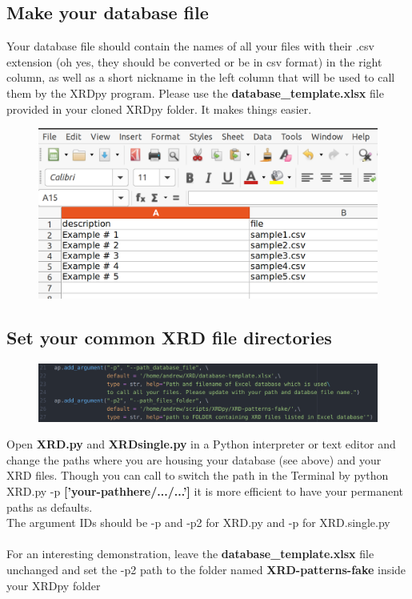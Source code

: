 \documentclass{article}
\begin{document}
\subsection{Make your database file}

Your database file should contain the names of all your files with their .csv extension (oh yes, they should be converted or be in csv format) in the right column, as well as a short nickname in the left column that will be used to call them by the XRDpy program. Please use the \textbf{database\_template.xlsx} file provided in your cloned XRDpy folder. It makes things easier.

\begin{figure}[htbp]
\centerline{\includegraphics[scale=.2]{database-template.png}}
\label{fig4}
\end{figure}

\subsection{Set your common XRD file directories}

\begin{figure}[htbp]
\centerline{\includegraphics[scale=.27]{xrd-paths.png}}
\label{fig5}
\end{figure}

Open \textbf{XRD.py} and \textbf{XRDsingle.py} in a Python interpreter or text editor and change the paths where you are housing your database (see above) and your XRD files. Though you can call to switch the path in the Terminal by python XRD.py -p \textbf{['your-pathhere/.../...']} it is more efficient to have your permanent paths as defaults. \\ The argument IDs should be -p and -p2 for XRD.py and -p for XRD.single.py \\\\
For an interesting demonstration, leave the \textbf{database\_template.xlsx} file unchanged and set the -p2 path to the folder named \textbf{XRD-patterns-fake} inside your XRDpy folder
\end{document}
